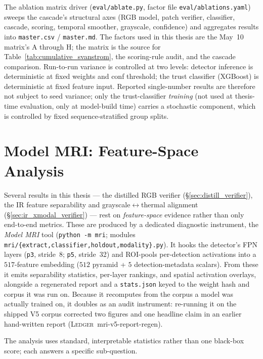 \documentclass[12pt,a4paper,oneside,openright]{book}
\begin{document}
The ablation matrix driver (\texttt{eval/ablate.py}, factor file \texttt{eval/ablations.yaml}) sweeps the cascade's structural axes (RGB model, patch verifier, classifier, cascade, scoring, temporal smoother, grayscale, confidence) and aggregates results into \texttt{master.csv} / \texttt{master.md}. The factors used in this thesis are the May~10 matrix's A through H; the matrix is the source for Table~\ref{tab:cumulative_svanstrom}, the scoring-rule audit, and the cascade comparison. Run-to-run variance is controlled at two levels: detector inference is deterministic at fixed weights and conf threshold; the trust classifier (XGBoost) is deterministic at fixed feature input. Reported single-number results are therefore not subject to seed variance; only the trust-classifier \emph{training} (not used at thesis-time evaluation, only at model-build time) carries a stochastic component, which is controlled by fixed sequence-stratified group splits.

\section{Model MRI: Feature-Space Analysis}
\label{sec:model_mri}

Several results in this thesis --- the distilled RGB verifier (\S\ref{sec:distill_verifier}), the IR feature separability and grayscale$\leftrightarrow$thermal alignment (\S\ref{sec:ir_xmodal_verifier}) --- rest on \emph{feature-space} evidence rather than only end-to-end metrics. These are produced by a dedicated diagnostic instrument, the \emph{Model MRI} tool (\texttt{python -m mri}; modules \texttt{mri/\{extract,classifier,holdout,modality\}.py}). It hooks the detector's FPN layers (\texttt{p3}, stride~8; \texttt{p5}, stride~32) and ROI-pools per-detection activations into a $517$-feature embedding ($512$ pyramid + $5$ detection-metadata scalars). From these it emits separability statistics, per-layer rankings, and spatial activation overlays, alongside a regenerated report and a \texttt{stats.json} keyed to the weight hash and corpus it was run on. Because it recomputes from the corpus a model was actually trained on, it doubles as an audit instrument: re-running it on the shipped V5 corpus corrected two figures and one headline claim in an earlier hand-written report (\textsc{Ledger}~mri-v5-report-regen).

The analysis uses standard, interpretable statistics rather than one black-box score; each answers a specific sub-question.
\end{document}
